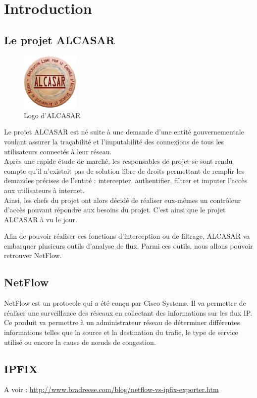 \section{Introduction}
\subsection{Le projet ALCASAR}

\begin{figure}
  \vspace{-20pt}
  \begin{center}
    \includegraphics[width=0.25\textwidth]{img/Alcasar-logo.png}
  \end{center}
  \vspace{-15pt}
  \caption{Logo d'ALCASAR}
  \vspace{-10pt}
\end{figure}
Le projet ALCASAR est né suite à une demande d'une entité gouvernementale voulant assurer la traçabilité et l'imputabilité des connexions de tous les utilisateurs connectés à leur réseau.\\
Après une rapide étude de marché, les responsables de projet se sont rendu compte qu'il n'existait pas de solution libre de droits permettant de remplir les demandes précises de l'entité : intercepter, authentifier, filtrer et imputer l'accès aux utilisateurs à internet.\\
Ainsi, les chefs du projet ont alors décidé de réaliser eux-mêmes un contrôleur d'accès pouvant répondre aux besoins du projet. C'est ainsi que le projet ALCASAR à vu le jour.\\\par
Afin de pouvoir réaliser ces fonctions d'interception ou de filtrage, ALCASAR va embarquer plusieurs outils d'analyse de flux. Parmi ces outils, nous allons pouvoir retrouver NetFlow.

\subsection{NetFlow}

NetFlow est un protocole qui a été conçu par Cisco Systems. Il va permettre de réaliser une surveillance des réseaux en collectant des informations sur les flux IP. Ce produit va permettre à un administrateur réseau de déterminer différentes informations telles que la source et la destination du trafic, le type de service utilisé ou encore la cause de nœuds de congestion.

\subsection{IPFIX}
A voir : \url{http://www.bradreese.com/blog/netflow-vs-ipfix-exporter.htm}